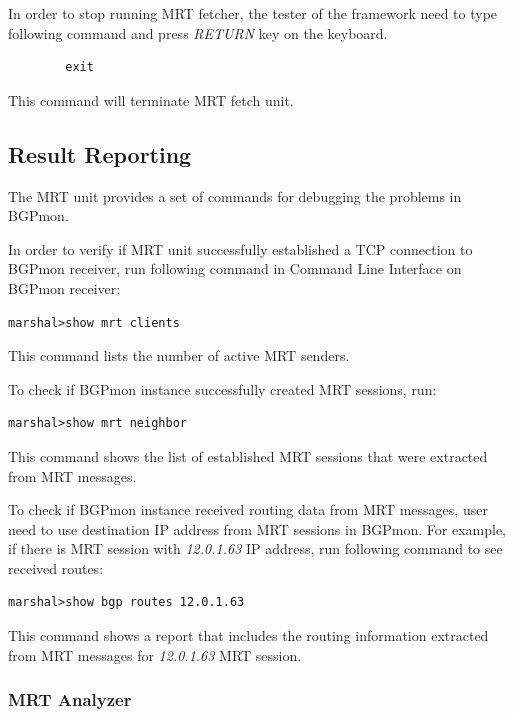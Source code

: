In order to stop running MRT fetcher, the tester of the framework need to type following command and  press \emph{RETURN} key on the keyboard. 
\begin{verbatim}
        exit
\end{verbatim}

This command will terminate MRT fetch unit. 


\subsection{Result Reporting}
\label{sec:mrtreport}

The MRT unit provides a set of commands for debugging the problems in BGPmon.   

In order to verify if MRT unit successfully established a TCP connection  to BGPmon receiver, run following command in Command Line Interface on BGPmon receiver:

\begin{verbatim}
marshal>show mrt clients
\end{verbatim}

This command lists the number of active MRT senders. 

To check if BGPmon instance successfully created MRT sessions, run:
\begin{verbatim}
marshal>show mrt neighbor
\end{verbatim}

This command shows the list of established MRT sessions that were extracted from MRT messages.

To check if BGPmon instance received routing data from MRT messages, user need to use destination IP address from MRT sessions in BGPmon. For example, if  there is MRT session with \emph{12.0.1.63} IP address, run following command to see received routes:

\begin{verbatim}
marshal>show bgp routes 12.0.1.63
\end{verbatim}

This command shows a report that includes the  routing information extracted  from MRT messages for \emph{12.0.1.63} MRT session. 

\subsubsection{MRT Analyzer}

